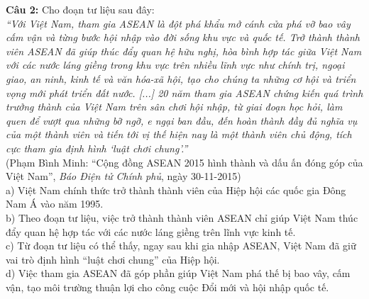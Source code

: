 \documentclass[12pt,a4paper]{article}
\begin{document}
\noindent \textbf{Câu 2:} Cho đoạn tư liệu sau đây:\\
\textit{``Với Việt Nam, tham gia ASEAN là đột phá khẩu mở cánh cửa phá vỡ bao vây cấm vận và từng bước hội nhập vào đời sống khu vực và quốc tế. Trở thành thành viên ASEAN đã giúp thúc đẩy quan hệ hữu nghị, hòa bình hợp tác giữa Việt Nam với các nước láng giềng trong khu vực trên nhiều lĩnh vực như chính trị, ngoại giao, an ninh, kinh tế và văn hóa-xã hội, tạo cho chúng ta những cơ hội và triển vọng mới phát triển đất nước. [...] 20 năm tham gia ASEAN chứng kiến quá trình trưởng thành của Việt Nam trên sân chơi hội nhập, từ giai đoạn học hỏi, làm quen để vượt qua những bỡ ngỡ, e ngại ban đầu, đến hoàn thành đầy đủ nghĩa vụ của một thành viên và tiến tới vị thế hiện nay là một thành viên chủ động, tích cực tham gia định hình `luật chơi chung'.''}\\
\hspace*{\fill}(Phạm Bình Minh: ``Cộng đồng ASEAN 2015 hình thành và dấu ấn đóng góp của Việt Nam'', \textit{Báo Điện tử Chính phủ}, ngày 30-11-2015)\\
\noindent a) Việt Nam chính thức trở thành thành viên của Hiệp hội các quốc gia Đông Nam Á vào năm 1995.\\


\noindent b) Theo đoạn tư liệu, việc trở thành thành viên ASEAN chỉ giúp Việt Nam thúc đẩy quan hệ hợp tác với các nước láng giềng trên lĩnh vực kinh tế.\\


\noindent c) Từ đoạn tư liệu có thể thấy, ngay sau khi gia nhập ASEAN, Việt Nam đã giữ vai trò định hình ``luật chơi chung'' của Hiệp hội.\\


\noindent d) Việc tham gia ASEAN đã góp phần giúp Việt Nam phá thế bị bao vây, cấm vận, tạo môi trường thuận lợi cho công cuộc Đổi mới và hội nhập quốc tế.
\end{document}
